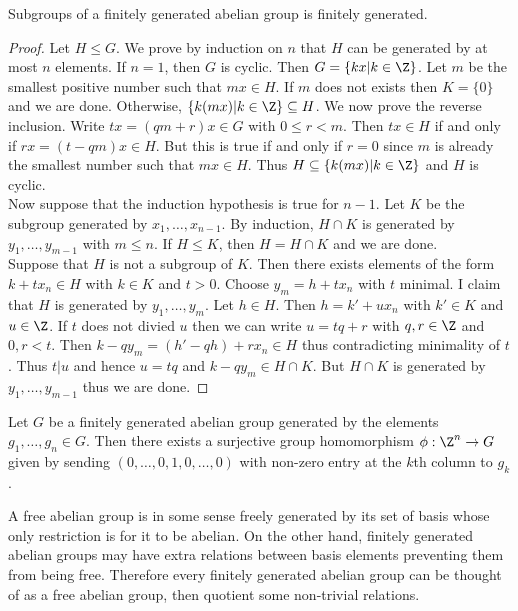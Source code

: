 \documentclass[a4paper]{article}
\begin{document}
\begin{prp}{}{} Subgroups of a finitely generated abelian group is finitely generated. 
\begin{proof}
Let $H\leq G$. We prove by induction on $n$ that $H$ can be generated by at most $n$ elements. If $n=1$, then $G$ is cyclic. Then $G=\{kx|k\in\Z\}$. Let $m$ be the smallest positive number such that $mx\in H$. If $m$ does not exists then $K=\{0\}$ and we are done. Otherwise, $\{k(mx)|k\in\Z\}\subseteq H$. We now prove the reverse inclusion. Write $tx=(qm+r)x\in G$ with $0\leq r<m$. Then $tx\in H$ if and only if $rx=(t-qm)x\in H$. But this is true if and only if $r=0$ since $m$ is already the smallest number such that $mx\in H$. Thus $H\subseteq\{k(mx)|k\in\Z\}$ and $H$ is cyclic. \\
Now suppose that the induction hypothesis is true for $n-1$.  Let $K$ be the subgroup generated by $x_1,\dots,x_{n-1}$. By induction, $H\cap K$ is generated by $y_1,\dots,y_{m-1}$ with $m\leq n$. If $H\leq K$, then $H=H\cap K$ and we are done. \\
Suppose that $H$ is not a subgroup of $K$. Then there exists elements of the form $k+tx_n\in H$ with $k\in K$ and $t>0$. Choose $y_m=h+tx_n$ with $t$ minimal. I claim that $H$ is generated by $y_1,\dots,y_m$. Let $h\in H$. Then $h=k'+ux_n$ with $k'\in K$ and $u\in\Z$. If $t$ does not divied $u$ then we can write $u=tq+r$ with $q,r\in\Z$ and $0,r<t$. Then $k-qy_m=(h'-qh)+rx_n\in H$ thus contradicting minimality of $t$. Thus $t|u$ and hence $u=tq$ and $k-qy_m\in H\cap K$. But $H\cap K$ is generated by $y_1,\dots,y_{m-1}$ thus we are done. 
\end{proof}
\end{prp}

\begin{prp}{}{} Let $G$ be a finitely generated abelian group generated by the elements $g_1,\dots,g_n\in G$. Then there exists a surjective group homomorphism $\phi:\Z^n\to G$ given by sending $(0,\dots,0,1,0,\dots,0)$ with non-zero entry at the $k$th column to $g_k$. 
\end{prp}

A free abelian group is in some sense freely generated by its set of basis whose only restriction is for it to be abelian. On the other hand, finitely generated abelian groups may have extra relations between basis elements preventing them from being free. Therefore every finitely generated abelian group can be thought of as a free abelian group, then quotient some non-trivial relations. 
\end{document}
